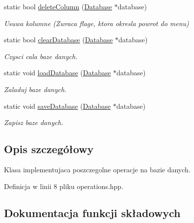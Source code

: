 \begin{DoxyCompactItemize}
static bool \mbox{\hyperlink{class_operations_a131a98d48f81a6795d545c6b5b018aaa}{delete\+Column}} (\mbox{\hyperlink{class_database}{Database}} $\ast$database)
\begin{DoxyCompactList}\small\item\em Usuwa kolumne (Zwraca flage, ktora okresla powrot do menu) \end{DoxyCompactList}\item 
\mbox{\label{class_operations_ad2594127002035dbb20a371e9f5c550a}} 
static bool \mbox{\hyperlink{class_operations_ad2594127002035dbb20a371e9f5c550a}{clear\+Database}} (\mbox{\hyperlink{class_database}{Database}} $\ast$database)
\begin{DoxyCompactList}\small\item\em Czysci cala baze danych. \end{DoxyCompactList}\item 
\mbox{\label{class_operations_a9b7e9f4a8ec752d5119a084d8c36c45e}} 
static void \mbox{\hyperlink{class_operations_a9b7e9f4a8ec752d5119a084d8c36c45e}{load\+Database}} (\mbox{\hyperlink{class_database}{Database}} $\ast$database)
\begin{DoxyCompactList}\small\item\em Zaladuj baze danych. \end{DoxyCompactList}\item 
\mbox{\label{class_operations_a4a62590f4f25415a675818ad0501aaa7}} 
static void \mbox{\hyperlink{class_operations_a4a62590f4f25415a675818ad0501aaa7}{save\+Database}} (\mbox{\hyperlink{class_database}{Database}} $\ast$database)
\begin{DoxyCompactList}\small\item\em Zapisz baze danych. \end{DoxyCompactList}\end{DoxyCompactItemize}


\subsection{Opis szczegółowy}
Klasa implementujaca poszczegolne operacje na bazie danych. 

Definicja w linii 8 pliku operations.\+hpp.



\subsection{Dokumentacja funkcji składowych}
\mbox{\label{class_operations_a0d787c05e02fa042225975ffc31b84ad}} 

